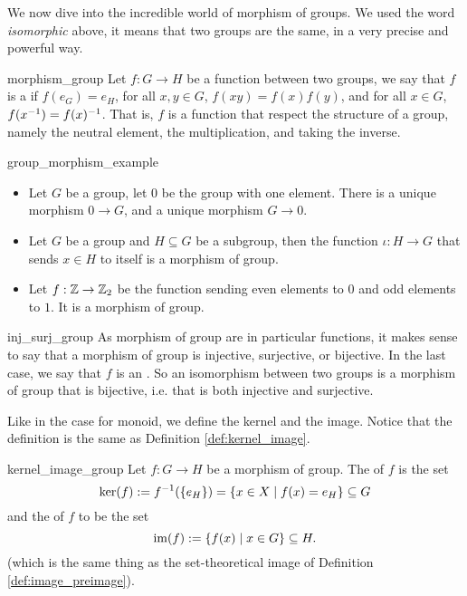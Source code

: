 We now dive into the incredible world of morphism of groups. We used the word \textit{isomorphic} above, it means that two groups are the same, in a very precise and powerful way.

\begin{cdef}{}{morphism_group}
    Let \( f : G \to H \) be a function between two groups, we say that \( f \) is a  if \( f(e_G) = e_H \), for all \( x, y \in G \), \( f(xy) = f(x)f(y) \), and for all \( x \in G \), \( f(x^{-1}) = f(x)^{-1} \). That is, \( f \) is a function that respect the structure of a group, namely the neutral element, the multiplication, and taking the inverse. 
\end{cdef}

\begin{cexp}{}{group_morphism_example}
    \begin{itemize}
        \item Let \( G \) be a group, let \( 0 \) be the group with one element. There is a unique morphism \( 0 \to G \), and a unique morphism \( G \to 0 \).
        \item Let \( G \) be a group and \( H \subseteq G \) be a subgroup, then the function \( \iota : H \to G \) that sends \( x \in H \) to itself is a morphism of group.
        \item Let \( f : \mathbb{Z} \to \mathbb{Z}_2 \) be the function sending even elements to \( 0 \) and odd elements to \( 1 \). It is a morphism of group. 
    \end{itemize}
\end{cexp}

\begin{crem}{}{inj_surj_group}
    As morphism of group are in particular functions, it makes sense to say that a morphism of group is injective, surjective, or bijective. In the last case, we say that \( f \) is an . So an isomorphism between two groups is a morphism of group that is bijective, i.e. that is both injective and surjective.
\end{crem}

Like in the case for monoid, we define the kernel and the image. Notice that the definition is the same as Definition \ref{def:kernel_image}.
\begin{cdef}{}{kernel_image_group}
    Let \( f : G \to H \) be a morphism of group. The  of \( f \) is the set
    \begin{equation*}
        \ker(f) := f^{-1}(\{ e_H \}) = \{ x \in X \mid f(x) = e_H \} \subseteq G
    \end{equation*}
    and the  of \( f \) to be the set
    \begin{equation*}
        \operatorname{im}(f) := \{ f(x) \mid x \in G \} \subseteq H.
    \end{equation*}
    (which is the same thing as the set-theoretical image of Definition \ref{def:image_preimage}).
\end{cdef}

